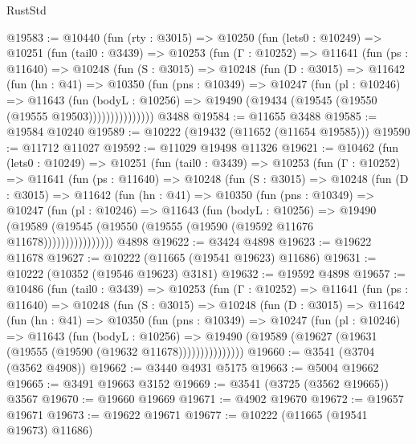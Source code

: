 \begin{lexlean}{RustStd}
\begin{coremodule}
@19583 := @10440
    (fun (rty : @3015) =>
    @10250
      (fun (lets0 : @10249) =>
      @10251
        (fun (tail0 : @3439) =>
        @10253
          (fun (Γ : @10252) =>
          @11641
            (fun (ps : @11640) =>
            @10248
              (fun (S : @3015) =>
              @10248
                (fun (D : @3015) =>
                @11642
                  (fun (hn : @41) =>
                  @10350
                    (fun (pns : @10349) =>
                    @10247
                      (fun (pl : @10246) =>
                      @11643
                        (fun (bodyL : @10256) =>
                        @19490 (@19434 (@19545 (@19550 (@19555 @19503)))))))))))))))
    @3488
@19584 := @11655 @3488
@19585 := @19584 @10240
@19589 := @10222 (@19432 (@11652 (@11654 @19585)))
@19590 := @11712 @11027
@19592 := @11029 @19498 @11326
@19621 := @10462
    (fun (lets0 : @10249) =>
    @10251
      (fun (tail0 : @3439) =>
      @10253
        (fun (Γ : @10252) =>
        @11641
          (fun (ps : @11640) =>
          @10248
            (fun (S : @3015) =>
            @10248
              (fun (D : @3015) =>
              @11642
                (fun (hn : @41) =>
                @10350
                  (fun (pns : @10349) =>
                  @10247
                    (fun (pl : @10246) =>
                    @11643
                      (fun (bodyL : @10256) =>
                      @19490
                        (@19589
                          (@19545 (@19550 (@19555 (@19590 (@19592 @11676 @11678))))))))))))))))
    @4898
@19622 := @3424 @4898
@19623 := @19622 @11678
@19627 := @10222 (@11665 (@19541 @19623) @11686)
@19631 := @10222 (@10352 (@19546 @19623) @3181)
@19632 := @19592 @4898
@19657 := @10486
    (fun (tail0 : @3439) =>
    @10253
      (fun (Γ : @10252) =>
      @11641
        (fun (ps : @11640) =>
        @10248
          (fun (S : @3015) =>
          @10248
            (fun (D : @3015) =>
            @11642
              (fun (hn : @41) =>
              @10350
                (fun (pns : @10349) =>
                @10247
                  (fun (pl : @10246) =>
                  @11643
                    (fun (bodyL : @10256) =>
                    @19490 (@19589 (@19627 (@19631 (@19555 (@19590 (@19632 @11678)))))))))))))))
@19660 := @3541 (@3704 (@3562 @4908))
@19662 := @3440 @4931 @5175
@19663 := @5004 @19662
@19665 := @3491 @19663 @3152
@19669 := @3541 (@3725 (@3562 @19665)) @3567
@19670 := @19660 @19669
@19671 := @4902 @19670
@19672 := @19657 @19671
@19673 := @19622 @19671
@19677 := @10222 (@11665 (@19541 @19673) @11686)

\end{coremodule}
\end{lexlean}
